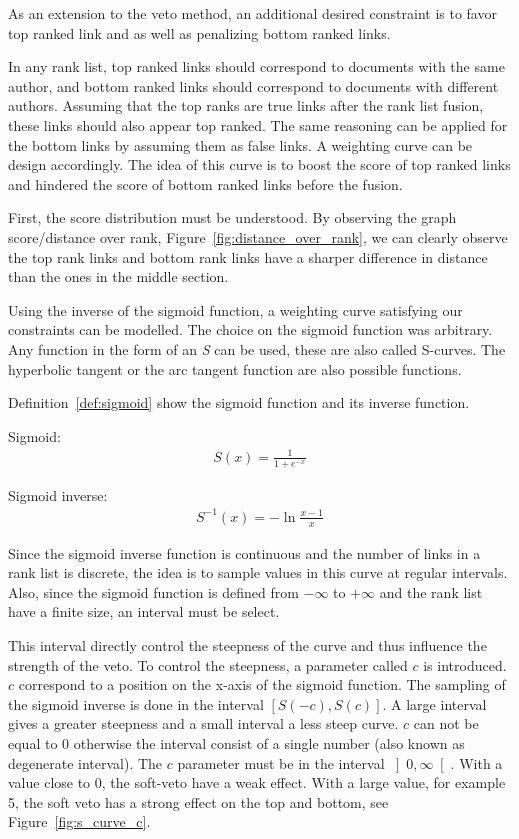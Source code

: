 As an extension to the veto method, an additional desired constraint is to favor top ranked link and as well as penalizing bottom ranked links.

In any rank list, top ranked links should correspond to documents with the same author, and bottom ranked links should correspond to documents with different authors.
Assuming that the top ranks are true links after the rank list fusion, these links should also appear top ranked.
The same reasoning can be applied for the bottom links by assuming them as false links.
A weighting curve can be design accordingly.
The idea of this curve is to boost the score of top ranked links and hindered the score of bottom ranked links before the fusion.

First, the score distribution must be understood.
By observing the graph score/distance over rank, Figure~\ref{fig:distance_over_rank}, we can clearly observe the top rank links and bottom rank links have a sharper difference in distance than the ones in the middle section.

Using the inverse of the sigmoid function, a weighting curve satisfying our constraints can be modelled.
The choice on the sigmoid function was arbitrary.
Any function in the form of an \textit{S} can be used, these are also called S-curves.
The hyperbolic tangent or the arc tangent function are also possible functions.

Definition~\ref{def:sigmoid} show the sigmoid function and its inverse function.

\begin{definition}
  Sigmoid:
  \begin{gather*}
    S(x) = \frac{1}{1+e^{-x}}
  \end{gather*}

  Sigmoid inverse:
  \begin{gather*}
    S^{-1}(x) = -\ln{\frac{x-1}{x}}
  \end{gather*}
\end{definition}

Since the sigmoid inverse function is continuous and the number of links in a rank list is discrete, the idea is to sample values in this curve at regular intervals.
Also, since the sigmoid function is defined from $-\infty$ to $+\infty$ and the rank list have a finite size, an interval must be select.

This interval directly control the steepness of the curve and thus influence the strength of the veto.
To control the steepness, a parameter called $c$ is introduced.
$c$ correspond to a position on the x-axis of the sigmoid function.
The sampling of the sigmoid inverse is done in the interval $\left[S(-c), S(c)\right]$.
A large interval gives a greater steepness and a small interval a less steep curve.
$c$ can not be equal to 0 otherwise the interval consist of a single number (also known as degenerate interval).
The $c$ parameter must be in the interval $\left]0, \infty\right[$.
With a value close to $0$, the soft-veto have a weak effect.
With a large value, for example 5, the soft veto has a strong effect on the top and bottom, see Figure~\ref{fig:s_curve_c}.

